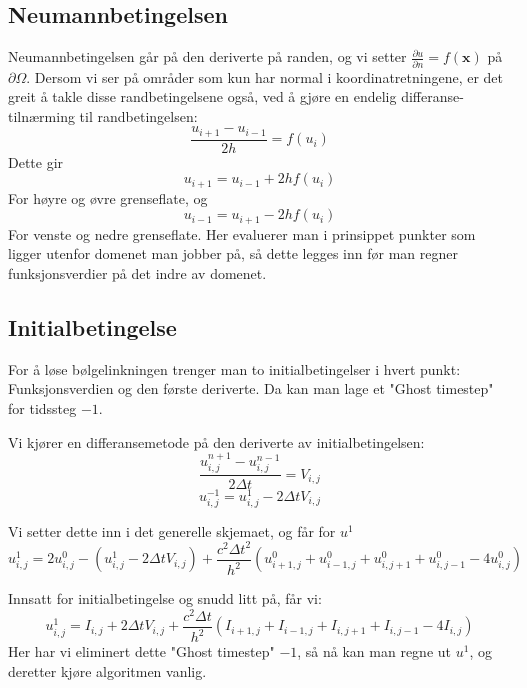 \documentclass[a4paper, 10pt]{article}
\newcommand{\mb}{\mathbf}
\newcommand{\p}{\partial}
\begin{document}
\subsection{Neumannbetingelsen}
Neumannbetingelsen går på den deriverte på randen, og vi setter $\frac{\p u}{\p n} = f(\mb{x})$ på $\p\Omega$. Dersom vi ser på områder som kun har normal i koordinatretningene, er det greit å takle disse randbetingelsene også, ved å gjøre en endelig differanse-tilnærming til randbetingelsen:
\begin{equation}
	\frac{u_{i+1}-u_{i-1}}{2h} = f(u_i)
\end{equation}
Dette gir 
\begin{equation}
	u_{i+1} = u_{i-1} + 2hf(u_i)
\end{equation}
For høyre og øvre grenseflate, og 
\begin{equation}
	u_{i-1} = u_{i+1} - 2hf(u_i) 
\end{equation}
For venste og nedre grenseflate. 
Her evaluerer man i prinsippet punkter som ligger utenfor domenet man jobber på, så dette legges inn før man regner funksjonsverdier på det indre av domenet.

\subsection{Initialbetingelse}
For å løse bølgelinkningen trenger man to initialbetingelser i hvert punkt: Funksjonsverdien og den første deriverte. Da kan man lage et "Ghost timestep" for tidssteg $-1$. 

Vi kjører en differansemetode på den deriverte av initialbetingelsen:
\begin{equation}
	\frac{u_{i, j}^{n+1}-u_{i, j}^{n-1}}{2\Delta t} = V_{i, j}
\end{equation}
\begin{equation}
	u^{-1}_{i,j} = u^1_{i,j} - 2\Delta t V_{i,j}
\end{equation}

Vi setter dette inn i det generelle skjemaet, og får for $u^1$
\begin{equation}
	u_{i, j}^{1} = 2u_{i,j}^0 - (u^1_{i,j} - 2\Delta t V_{i,j}) + \frac{c^2 \Delta t^2}{h^2}\left( u_{i+1, j}^0 + u_{i-1, j}^0 + u_{i, j+1}^0 + u_{i, j-1}^0 - 4u_{i,j}^0\right)
\end{equation}

Innsatt for initialbetingelse og snudd litt på, får vi:
\begin{equation}
	u_{i, j}^1 = I_{i,j} + 2\Delta t V_{i,j} + \frac{c^2\Delta t}{h^2} (I_{i+1, j} + I_{i-1, j} + I_{i, j+1}+I_{i, j-1} - 4I_{i,j})
\end{equation}
Her har vi eliminert dette "Ghost timestep" $-1$, så nå kan man regne ut $u^1$, og deretter kjøre algoritmen vanlig.
\end{document}

